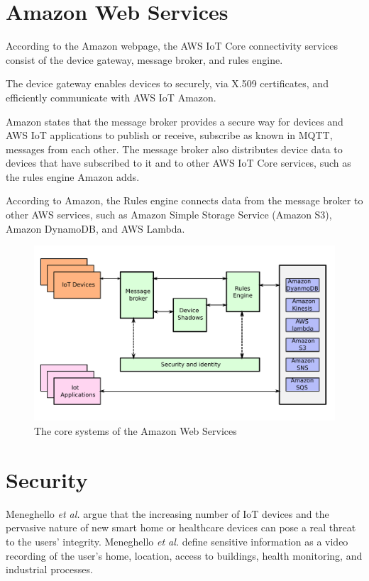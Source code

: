 \section{Amazon Web Services}
According to the Amazon webpage, the AWS IoT Core connectivity services consist of the device gateway, message broker, and rules engine\cite{AWS2021}.

The device gateway enables devices to securely, via X.509 certificates, and efficiently communicate with AWS IoT Amazon.

Amazon states that the message broker provides a secure way for devices and AWS IoT applications to publish or receive, subscribe as known in MQTT, messages from each other.
The message broker also distributes device data to devices that have subscribed to it and to other AWS IoT Core services, such as the rules engine Amazon adds. 

According to Amazon, the Rules engine connects data from the message broker to other AWS services, such as Amazon Simple Storage Service (Amazon S3), Amazon DynamoDB, and AWS Lambda.

\begin{figure}[H]
    \centering
    \includegraphics[width=\textwidth]{Pictures/aws.pdf} 
    \caption{The core systems of the Amazon Web Services}
    \label{diagram AWS}
\end{figure}

\section{Security}
Meneghello \textit{et al.} argue that the increasing number of IoT devices and the pervasive nature of new smart home or healthcare devices can pose a real threat to the users' integrity\cite{Meneghello2019}.
Meneghello \textit{et al.} define sensitive information as a video recording of the user's home, location, access to buildings, health monitoring, and industrial processes.

